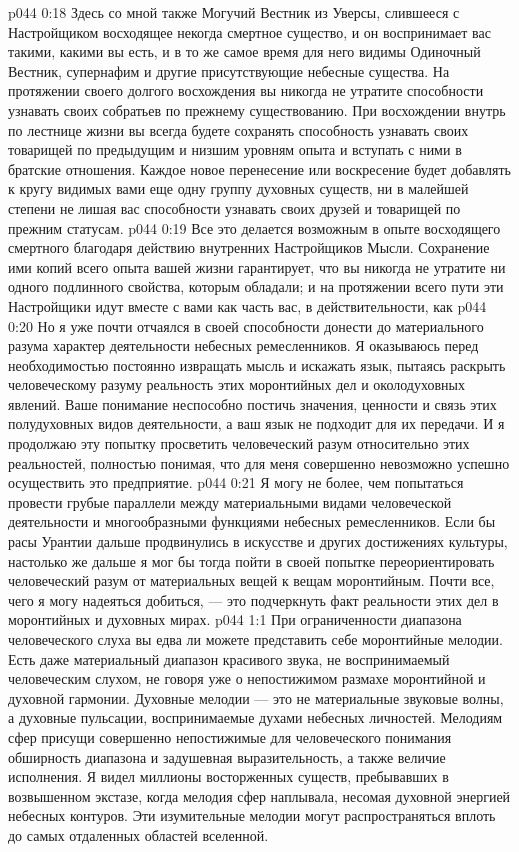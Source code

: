 \vs p044 0:18 Здесь со мной также Могучий Вестник из Уверсы, слившееся с Настройщиком восходящее некогда смертное существо, и он воспринимает вас такими, какими вы есть, и в то же самое время для него видимы Одиночный Вестник, супернафим и другие присутствующие небесные существа. На протяжении своего долгого восхождения вы никогда не утратите способности узнавать своих собратьев по прежнему существованию. При восхождении внутрь по лестнице жизни вы всегда будете сохранять способность узнавать своих товарищей по предыдущим и низшим уровням опыта и вступать с ними в братские отношения. Каждое новое перенесение или воскресение будет добавлять к кругу видимых вами еще одну группу духовных существ, ни в малейшей степени не лишая вас способности узнавать своих друзей и товарищей по прежним статусам.
\vs p044 0:19 Все это делается возможным в опыте восходящего смертного благодаря действию внутренних Настройщиков Мысли. Сохранение ими копий всего опыта вашей жизни гарантирует, что вы никогда не утратите ни одного подлинного свойства, которым обладали; и на протяжении всего пути эти Настройщики идут вместе с вами как часть вас, в действительности, как 
\vs p044 0:20 Но я уже почти отчаялся в своей способности донести до материального разума характер деятельности небесных ремесленников. Я оказываюсь перед необходимостью постоянно извращать мысль и искажать язык, пытаясь раскрыть человеческому разуму реальность этих моронтийных дел и околодуховных явлений. Ваше понимание неспособно постичь значения, ценности и связь этих полудуховных видов деятельности, а ваш язык не подходит для их передачи. И я продолжаю эту попытку просветить человеческий разум относительно этих реальностей, полностью понимая, что для меня совершенно невозможно успешно осуществить это предприятие.
\vs p044 0:21 \pc Я могу не более, чем попытаться провести грубые параллели между материальными видами человеческой деятельности и многообразными функциями небесных ремесленников. Если бы расы Урантии дальше продвинулись в искусстве и других достижениях культуры, настолько же дальше я мог бы тогда пойти в своей попытке переориентировать человеческий разум от материальных вещей к вещам моронтийным. Почти все, чего я могу надеяться добиться, --- это подчеркнуть факт реальности этих дел в моронтийных и духовных мирах.
\vs p044 1:1 При ограниченности диапазона человеческого слуха вы едва ли можете представить себе моронтийные мелодии. Есть даже материальный диапазон красивого звука, не воспринимаемый человеческим слухом, не говоря уже о непостижимом размахе моронтийной и духовной гармонии. Духовные мелодии --- это не материальные звуковые волны, а духовные пульсации, воспринимаемые духами небесных личностей. Мелодиям сфер присущи совершенно непостижимые для человеческого понимания обширность диапазона и задушевная выразительность, а также величие исполнения. Я видел миллионы восторженных существ, пребывавших в возвышенном экстазе, когда мелодия сфер наплывала, несомая духовной энергией небесных контуров. Эти изумительные мелодии могут распространяться вплоть до самых отдаленных областей вселенной.
